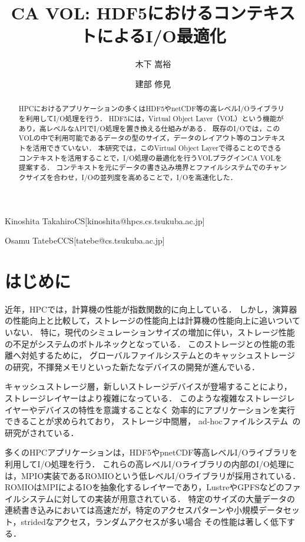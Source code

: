 \documentclass[submit,techrep,noauthor]{ipsj}
\begin{document}

\title{CA VOL: HDF5におけるコンテキストによるI/O最適化}

\author{木下 嵩裕}{Kinoshita Takahiro}{CS}[kinoshita@hpcs.cs.tsukuba.ac.jp]
\author{建部 修見}{Osamu Tatebe}{CCS}[tatebe@cs.tsukuba.ac.jp]

\begin{abstract}
	HPCにおけるアプリケーションの多くはHDF5やnetCDF等の高レベルI/Oライブラリを利用してI/O処理を行う．
	HDF5には，Virtual Object Layer（VOL）という機能があり，高レベルなAPIでI/O処理を置き換える仕組みがある．
	既存のI/Oでは，このVOLの中で利用可能であるデータの型のサイズ，データのレイアウト等のコンテキストを活用できていない．
	本研究では，このVirtual Object Layerで得ることのできるコンテキストを活用することで，I/O処理の最適化を行うVOLプラグインCA VOLを提案する．
	コンテキストを元にデータの書き込み境界とファイルシステムでのチャンクサイズを合わせ，I/Oの並列度を高めることで，I/Oを高速化した．
\end{abstract}

\maketitle

\section{はじめに}
近年，HPCでは，計算機の性能が指数関数的に向上している．
しかし，演算器の性能向上と比較して，ストレージの性能向上は計算機の性能向上に追いついていない．
特に，現代のシミュレーションサイズの増加に伴い，ストレージ性能の不足がシステムのボトルネックとなっている．
このストレージとの性能の乖離へ対処するために，
グローバルファイルシステムとのキャッシュストレージの研究，不揮発メモリといった新たなデバイスの開発が進んでいる．

キャッシュストレージ層，新しいストレージデバイスが登場することにより，
ストレージレイヤーはより複雑になっている．
このような複雑なストレージレイヤーやデバイスの特性を意識することなく
効率的にアプリケーションを実行できることが求められており，
ストレージ中間層\cite{wang2016burstbuffer,moody2017unifyfs}，
ad-hocファイルシステム~\cite{vef2018gekkofs,tatebe2022chfs}の研究がされている．


多くのHPCアプリケーションは，HDF5\cite{hdf5}やpnetCDF\cite{pnetcdf}等高レベルI/Oライブラリを利用してI/O処理を行う．\cite{byna2020exahdf5}
これらの高レベルI/Oライブラリの内部のI/O処理には，MPIO実装であるROMIOという低レベルI/Oライブラリが採用されている．
ROMIOはMPIによるIOを抽象化するレイヤーであり，LustreやGPFSなどのファイルシステムに対しての実装が用意されている．
特定のサイズの大量データの連続書き込みにおいては高速だが，特定のアクセスパターンや小規模データセット，stridedなアクセス，ランダムアクセスが多い場合
その性能は著しく低下する．
\end{document}
